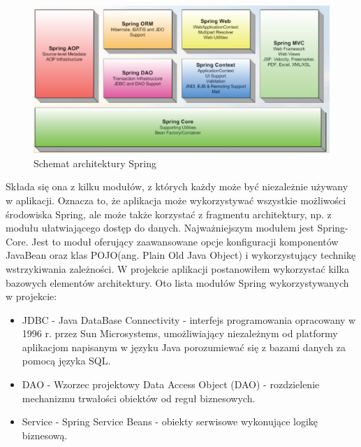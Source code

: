 \vspace*{0.1cm}
\begin{figure}[!ht]
\label{img:rysunek_spring}
\includegraphics[scale=0.31]{images/spring-modules}
\caption[Rysunek przedstawiający model architektury Spring]{Schemat architektury Spring}
\end{figure}

Składa się ona z kilku modułów, z których każdy może być niezależnie używany w aplikacji. Oznacza to, że aplikacja może wykorzystywać wszystkie możliwości środowiska Spring, ale może także korzystać z fragmentu architektury, np. z modułu ułatwiającego dostęp do danych. Najważniejszym modułem jest Spring-Core. Jest to moduł oferujący zaawansowane opcje konfiguracji komponentów JavaBean oraz klas POJO(ang. Plain Old Java Object) i wykorzystujący technikę wstrzykiwania zależności.
W projekcie aplikacji postanowiłem wykorzystać kilka bazowych elementów architektury. Oto lista modułów Spring wykorzystywanych w projekcie:
\begin{itemize}
 \item JDBC - Java DataBase Connectivity - interfejs programowania opracowany w 1996 r. przez Sun Microsystems, umożliwiający niezależnym od platformy aplikacjom napisanym w języku Java porozumiewać się z bazami danych za pomocą języka SQL.
 \item DAO - Wzorzec projektowy Data Access Object (DAO) - rozdzielenie mechanizmu trwałości obiektów od reguł biznesowych.
 \item Service - Spring Service Beans - obiekty serwisowe wykonujące logikę biznesową.
\end{itemize}

